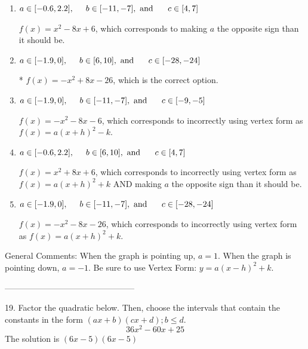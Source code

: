 \documentclass{extbook}[14pt]
\begin{document}
\begin{enumerate}[label=\Alph*.] 
\item $ a \in [-0.6, 2.2], \hspace*{5mm} b \in [-11, -7], \text{ and } \hspace*{5mm} c \in [4, 7] $ 

 $f(x)=x^{2} -8 x + 6$, which corresponds to making $a$ the opposite sign than it should be. 
\item $ a \in [-1.9, 0], \hspace*{5mm} b \in [6, 10], \text{ and } \hspace*{5mm} c \in [-28, -24] $ 

 * $f(x)=-x^{2} +8 x -26$, which is the correct option. 
\item $ a \in [-1.9, 0], \hspace*{5mm} b \in [-11, -7], \text{ and } \hspace*{5mm} c \in [-9, -5] $ 

 $f(x)=-x^{2} -8 x -6$, which corresponds to incorrectly using vertex form as $f(x) = a(x+h)^2 - k$. 
\item $ a \in [-0.6, 2.2], \hspace*{5mm} b \in [6, 10], \text{ and } \hspace*{5mm} c \in [4, 7] $ 

 $f(x)=x^{2} +8 x + 6$, which corresponds to incorrectly using vertex form as $f(x) = a(x+h)^2+k$ AND making $a$ the opposite sign than it should be. 
\item $ a \in [-1.9, 0], \hspace*{5mm} b \in [-11, -7], \text{ and } \hspace*{5mm} c \in [-28, -24] $ 

 $f(x)=-x^{2} -8 x -26$, which corresponds to incorrectly using vertex form as $f(x) = a(x+h)^2+k$. 
\end{enumerate} 
 
General Comments: When the graph is pointing up, $a=1$. When the graph is pointing down, $a=-1$. Be sure to use Vertex Form: $y = a(x-h)^2+k$.

-----------------------------------------------

19. Factor the quadratic below. Then, choose the intervals that contain the constants in the form $(ax+b)(cx+d); b \leq d.$
\[ 36x^{2} -60 x + 25 \] 
The solution is $ (6x -5)(6x -5) $ 
\end{document}
